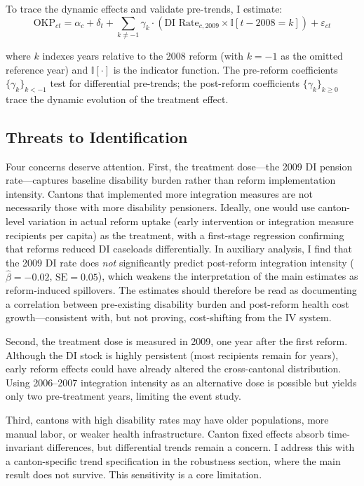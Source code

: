 \documentclass[12pt]{article}
\newcommand{\ind}{\mathbb{I}}
\begin{document}
To trace the dynamic effects and validate pre-trends, I estimate:
\begin{equation}
\text{OKP}_{ct} = \alpha_c + \delta_t + \sum_{k \neq -1} \gamma_k \cdot (\text{DI Rate}_{c,2009} \times \ind[t - 2008 = k]) + \varepsilon_{ct}
\label{eq:eventstudy}
\end{equation}

\noindent where $k$ indexes years relative to the 2008 reform (with $k = -1$ as the omitted reference year) and $\ind[\cdot]$ is the indicator function. The pre-reform coefficients $\{\gamma_k\}_{k<-1}$ test for differential pre-trends; the post-reform coefficients $\{\gamma_k\}_{k \geq 0}$ trace the dynamic evolution of the treatment effect.

\subsection{Threats to Identification}

Four concerns deserve attention. First, the treatment dose---the 2009 DI pension rate---captures baseline disability burden rather than reform implementation intensity. Cantons that implemented more integration measures are not necessarily those with more disability pensioners. Ideally, one would use canton-level variation in actual reform uptake (early intervention or integration measure recipients per capita) as the treatment, with a first-stage regression confirming that reforms reduced DI caseloads differentially. In auxiliary analysis, I find that the 2009 DI rate does \emph{not} significantly predict post-reform integration intensity ($\hat{\beta} = -0.02$, $\text{SE} = 0.05$), which weakens the interpretation of the main estimates as reform-induced spillovers. The estimates should therefore be read as documenting a correlation between pre-existing disability burden and post-reform health cost growth---consistent with, but not proving, cost-shifting from the IV system.

Second, the treatment dose is measured in 2009, one year after the first reform. Although the DI stock is highly persistent (most recipients remain for years), early reform effects could have already altered the cross-cantonal distribution. Using 2006--2007 integration intensity as an alternative dose is possible but yields only two pre-treatment years, limiting the event study.

Third, cantons with high disability rates may have older populations, more manual labor, or weaker health infrastructure. Canton fixed effects absorb time-invariant differences, but differential trends remain a concern. I address this with a canton-specific trend specification in the robustness section, where the main result does not survive. This sensitivity is a core limitation.
\end{document}
